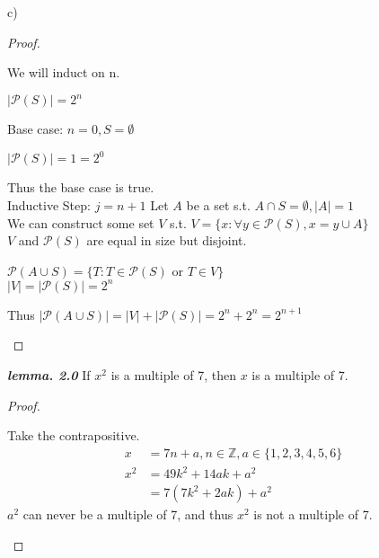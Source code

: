 \documentclass[11pt]{article}
\begin{document}
\begin{flushleft}
\bigskip c) \bigskip

\begin{proof} $ $ \\

\begin{adjustwidth}{3em}{0pt}

We will induct on n.

\begin{center}
$ |\mathcal{P}(S)| = 2^n $\\
\end{center}
Base case: $n=0, S = \emptyset$\\
\begin{center}
$|\mathcal{P}(S)| = 1 = 2^0$
\end{center}
Thus the base case is true.\\
Inductive Step: $j = n+1$ Let $A$ be a set s.t. $A \cap S = \emptyset , |A| = 1$\\
We can construct some set $V$ s.t. $V = \{ x: \forall y \in \mathcal{P}(S), x = y \cup A \}$\\
$V$ and $\mathcal{P}(S)$ are equal in size but disjoint.
\\
\begin{center}
$\mathcal{P}(A \cup S) = \{ T: T \in \mathcal{P}(S)$ or $ T \in V \}$ \\
$|V| = |\mathcal{P}(S)| = 2^n \ $ \\
\end{center}
Thus $| \mathcal{P}(A \cup S)| = |V| + |\mathcal{P}(S)| = 2^n + 2^n = 2^{n+1}$


\end{adjustwidth}

\end{proof}

\newpage

\emph{\textbf{lemma. 2.0}} If $x^2$ is a multiple of 7, then $x$ is a multiple of 7.
\begin{proof}
$ $ \\
\begin{adjustwidth}{3em}{0pt}
Take the contrapositive.
\begin{align*}
x & =7n + a, n \in \mathbb{Z}, a \in \{ 1,2,3,4,5,6 \}\\
x^2 & = 49k^2 + 14ak + a^2 \\
& = 7(7k^2 + 2ak) + a^2
\end{align*}
$a^2$ can never be a multiple of 7, and thus $x^2$ is not a multiple of 7.
\end{adjustwidth}
\end{proof}


\end{flushleft}
\end{document}
